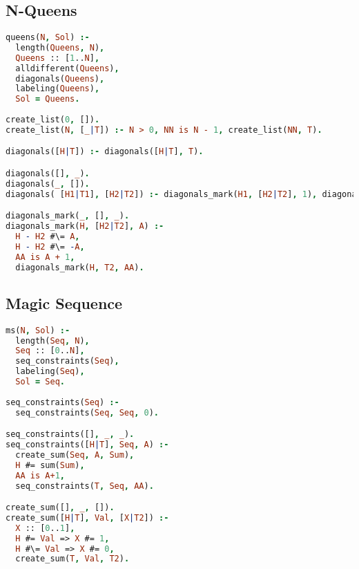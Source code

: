 \section{\eclipse}

\subsection{N-Queens}
\begin{lstlisting}[language=Prolog]
queens(N, Sol) :- 
  length(Queens, N),
  Queens :: [1..N],
  alldifferent(Queens),
  diagonals(Queens),
  labeling(Queens),
  Sol = Queens.
  
create_list(0, []).
create_list(N, [_|T]) :- N > 0, NN is N - 1, create_list(NN, T).

diagonals([H|T]) :- diagonals([H|T], T).

diagonals([], _).
diagonals(_, []).
diagonals( [H1|T1], [H2|T2]) :- diagonals_mark(H1, [H2|T2], 1), diagonals(T1, T2).

diagonals_mark(_, [], _).
diagonals_mark(H, [H2|T2], A) :-
  H - H2 #\= A,
  H - H2 #\= -A,
  AA is A + 1,
  diagonals_mark(H, T2, AA).
\end{lstlisting}

\subsection{Magic Sequence}
\begin{lstlisting}[language=Prolog]
ms(N, Sol) :-
  length(Seq, N),
  Seq :: [0..N],
  seq_constraints(Seq),
  labeling(Seq),
  Sol = Seq.
  
seq_constraints(Seq) :-
  seq_constraints(Seq, Seq, 0).

seq_constraints([], _, _).
seq_constraints([H|T], Seq, A) :-
  create_sum(Seq, A, Sum),
  H #= sum(Sum),
  AA is A+1,
  seq_constraints(T, Seq, AA).

create_sum([], _, []).
create_sum([H|T], Val, [X|T2]) :-
  X :: [0..1],
  H #= Val => X #= 1,
  H #\= Val => X #= 0,
  create_sum(T, Val, T2).
\end{lstlisting}

